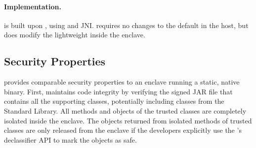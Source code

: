 





\paragraph{Implementation.} \sysname{} is built upon \jvmname{}, using \java{} and JNI.
\sysname{} requires no changes to the default \jvm{} in the host,
but does modify the lightweight \jvm{} inside the enclave.

\subsection{Security Properties}

\sysname{} provides comparable security properties to an enclave running a static, native binary.
First, \sysname{} maintains code integrity by verifying the signed JAR file that contains all the supporting classes, potentially including classes from the \java{} Standard Library.
All methods and objects of the trusted classes are completely isolated 
inside the \sgx{} enclave.
The objects returned from isolated methods of trusted classes are only released
from the enclave if the developers explicitly use the \sysname{}'s declassifier API to mark the objects as safe.

